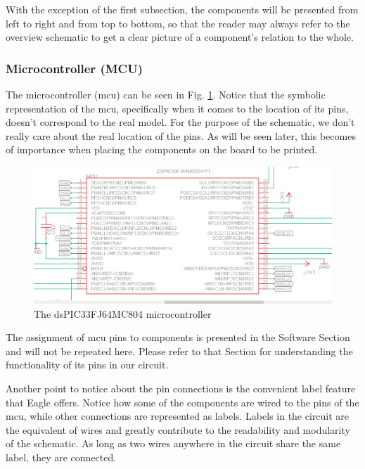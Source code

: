 With the exception of the first subsection, the components will be presented from left to right and from top to bottom, so that the reader may always refer to the overview schematic to get a clear picture of a component's relation to the whole.

\FloatBarrier
\vspace{1cm}

\subsubsection{Microcontroller (MCU)}

The microcontroller (mcu) can be seen in Fig. \ref{fig:mcuL}.
Notice that the symbolic representation of the mcu, specifically when it comes to the location of its pins, doesn't correspond to the real model. For the purpose of the schematic, we don't really care about the real location of the pins. As will be seen later, this becomes of importance when placing the components on the board to be printed.

\begin{figure}[htb]
    \centering
    \includegraphics[width=1\textwidth]{figures/hardware/MCU.PNG}
    \caption{The dsPIC33FJ64MC804 microcontroller}
    \label{fig:mcuL}
\end{figure}

\FloatBarrier

The assignment of mcu pins to components is presented in the Software Section and will not be repeated here. Please refer to that Section for understanding the functionality of its pins in our circuit.

Another point to notice about the pin connections is the convenient label feature that Eagle offers. Notice how some of the components are wired to the pins of the mcu, while other connections are represented as labels. Labels in the circuit are the equivalent of wires and greatly contribute to the readability and modularity of the schematic. As long as two wires anywhere in the circuit share the same label, they are connected.


